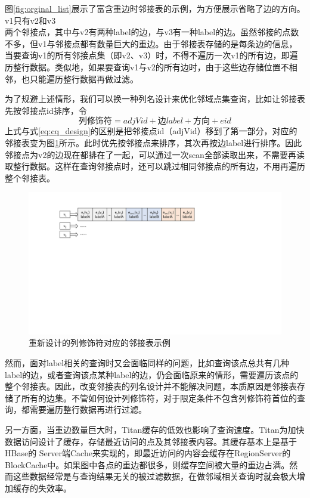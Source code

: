 图\ref{fig:orginal_list}展示了富含重边时邻接表的示例，为方便展示省略了边的方向。v1只有v2和v3\\
两个邻接点，其中与v2有两种label的边，与v3有一种label的边。虽然邻接的点数不多，但v1与邻接点都有数量巨大的重边。由于邻接表存储的是每条边的信息，当要查询v1的所有邻接点集（即v2、v3）时，不得不遍历一次v1的所有边，即遍历整行数据。类似地，如果要查询v1与v2的所有边时，由于这些边存储位置不相邻，也只能遍历整行数据再做过滤。

为了规避上述情形，我们可以换一种列名设计来优化邻域点集查询，比如让邻接表先按邻接点id排序，令
\begin{equation}
  \mbox{列修饰符} = adjVid + \mbox{边}label + \mbox{方向} + eid \label{eq:cq_redesign}
\end{equation}
上式与式\ref{eq:cq_design}的区别是把邻接点id（adjVid）移到了第一部分，对应的邻接表变为图\ref{fig:redesign_list}所示。此时优先按邻接点来排序，其次再按边label进行排序。因此邻接点为v2的边现在都排在了一起，可以通过一次scan全部读取出来，不需要再读取整行数据。这样在查询邻接点时，还可以跳过相同邻接点的所有边，不用再遍历整个邻接表。

\begin{figure}[htbp]
\centering
\includegraphics[width=150mm]{fig/redesign_list.pdf}
\caption{重新设计的列修饰符对应的邻接表示例}
\label{fig:redesign_list}
\end{figure}

然而，面对label相关的查询时又会面临同样的问题，比如查询该点总共有几种label的边，或者查询该点某种label的边，仍会面临原来的情形，需要遍历该点的整个邻接表。因此，改变邻接表的列名设计并不能解决问题，本质原因是邻接表存储了所有的边集。不管如何设计列修饰符，对于限定条件不包含列修饰符首位的查询，都需要遍历整行数据再进行过滤。


另一方面，当重边数量巨大时，Titan缓存的低效也影响了查询速度。Titan为加快数据访问设计了缓存，存储最近访问的点及其邻接表内容。其缓存基本上是基于HBase的 Server端Cache来实现的，即最近访问的内容会缓存在RegionServer的 BlockCache中。如果图中各点的重边都很多，则缓存空间被大量的重边占满。然而这些数据经常是与查询结果无关的被过滤数据，在做邻域相关查询时就会极大增加缓存的失效率。

